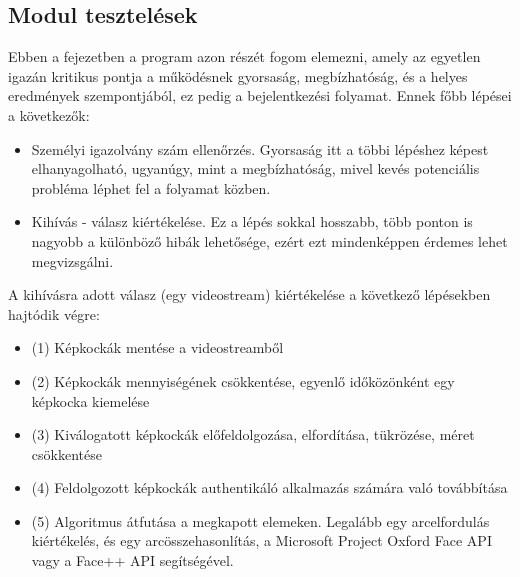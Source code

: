 \subsection{Modul tesztelések}
Ebben a fejezetben a program azon részét fogom elemezni, amely az egyetlen igazán kritikus pontja a működésnek gyorsaság, megbízhatóság, és a helyes eredmények szempontjából, ez pedig a bejelentkezési folyamat. Ennek főbb lépései a következők:
\begin{itemize}
\item Személyi igazolvány szám ellenőrzés. Gyorsaság itt a többi lépéshez képest elhanyagolható, ugyanúgy, mint a megbízhatóság, mivel kevés potenciális probléma léphet fel a folyamat közben.
\item  Kihívás - válasz kiértékelése. Ez a lépés sokkal hosszabb, több ponton is nagyobb a különböző hibák lehetősége, ezért ezt mindenképpen érdemes lehet megvizsgálni.
\end{itemize}
A kihívásra adott válasz (egy videostream) kiértékelése a következő lépésekben hajtódik végre:
\begin{itemize}
\item (1) Képkockák mentése a videostreamből
\item (2) Képkockák mennyiségének csökkentése, egyenlő időközönként egy képkocka kiemelése
\item (3) Kiválogatott képkockák előfeldolgozása, elfordítása, tükrözése, méret csökkentése
\item (4) Feldolgozott képkockák authentikáló alkalmazás számára való továbbítása
\item (5) Algoritmus átfutása a megkapott elemeken. Legalább egy arcelfordulás kiértékelés, és egy arcösszehasonlítás, a Microsoft Project Oxford Face API vagy a Face++ API segítségével.
\end{itemize}

